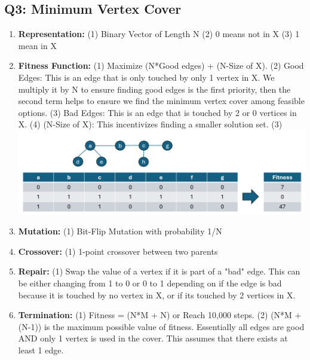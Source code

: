 \documentclass{article}
\begin{document}
\subsection*{Q3: Minimum Vertex Cover}
\begin{enumerate}[label=(\alph*)]
    \item \textbf{Representation:}
    \subitem (1) Binary Vector of Length N
    \subitem (2) 0 means not in X
    \subitem (3) 1 mean in X

    \item \textbf{Fitness Function:}
    \subitem (1) Maximize (N*Good edges) + (N-Size of X).
    \subitem (2) Good Edges: This is an edge that is only touched by only 1 vertex in X. We multiply it by N to ensure finding good edges is the first priority, then the second term helps to ensure we find the minimum vertex cover among feasible options.
    \subitem (3) Bad Edges: This is an edge that is touched by 2 or 0 vertices in X.
    \subitem (4) (N-Size of X): This incentivizes finding a smaller solution set.
    \subitem (3) \includegraphics[width=.75\textwidth]{fitness_problem3.PNG}

    \item \textbf{Mutation:}
    \subitem (1) Bit-Flip Mutation with probability 1/N

    \item \textbf{Crossover:}
    \subitem (1) 1-point crossover between two parents

    \item \textbf{Repair:}
    \subitem (1) Swap the value of a vertex if it is part of a "bad" edge. This can be either changing from 1 to 0 or 0 to 1 depending on if the edge is bad because it is touched by no vertex in X, or if its touched by 2 vertices in X.

    \item \textbf{Termination:}
    \subitem (1) Fitness = (N*M + N) or Reach 10,000 steps.
    \subitem (2) (N*M + (N-1)) is the maximum possible value of fitness. Essentially all edges are good AND only 1 vertex is used in the cover. This assumes that there exists at least 1 edge.
\end{enumerate}
\end{document}
